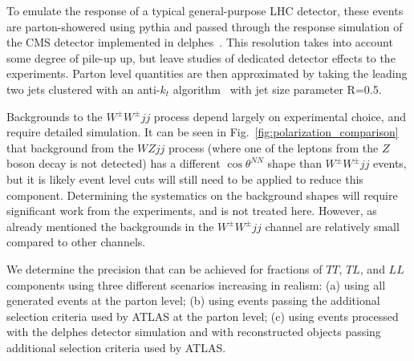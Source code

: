 \documentclass[aps,prl,twocolumn,showpacs,superscriptaddress,groupeaddress,floatfix]{revtex4}
\def\ssWW{\ensuremath{ W^{\pm}W^{\pm}jj }\xspace}
\def\tsNN{\ensuremath{ \theta^{NN} }\xspace}
\def\ctsNN{\ensuremath{ \cos\tsNN }\xspace}
\begin{document}
To emulate the response of a typical general-purpose LHC detector, these events are parton-showered using {\sc pythia}\cite{pythia} and passed through the  response simulation of the CMS detector implemented in {\sc delphes}~\cite{delphes}. This resolution takes into account some degree of pile-up up, but leave studies of dedicated detector effects to the experiments.  Parton level quantities are then approximated by taking the leading two jets clustered with an anti-$k_t$ algorithm~\cite{antikt} with jet size parameter R=0.5.


Backgrounds to the \ssWW process depend largely on experimental choice, and require detailed simulation. It can be seen in Fig.~\ref{fig:polarization_comparison} that background from the $WZjj$ process (where one of 
the leptons from the $Z$ boson decay is not detected) has a different \ctsNN shape than \ssWW events, but it is likely event level cuts will still need to be applied to reduce this component. Determining the systematics on the background shapes will require significant work from the experiments, and is not treated here. However, as already mentioned the backgrounds in the \ssWW channel are relatively small compared to other channels.


We determine the precision that can be achieved for fractions of $TT$, $TL$, and $LL$ components using three different scenarios increasing in realism: (a) using all  generated events at the parton level; 
(b) using events passing the additional selection criteria used by ATLAS at the parton level; 
(c) using events processed with the {\sc delphes} detector simulation and with reconstructed objects passing additional selection criteria used by \mbox{ATLAS}. 
\end{document}
